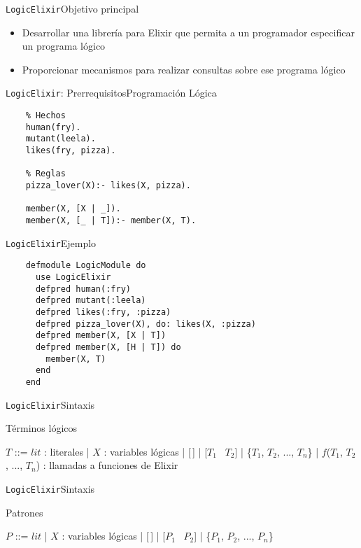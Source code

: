\documentclass[14pt,aspectratio=169]{beamer}
\begin{document}
\begin{frame}{\texttt{LogicElixir}}{Objetivo principal}
  \begin{itemize}
    \item Desarrollar una librería para Elixir que permita
    a un programador especificar un programa lógico
    \item Proporcionar mecanismos para realizar consultas sobre
    ese programa lógico
  \end{itemize}
\end{frame}

\begin{frame}[fragile]{\texttt{LogicElixir}: Prerrequisitos}{Programación Lógica}
  \begin{verbatim}
    % Hechos
    human(fry).
    mutant(leela).
    likes(fry, pizza).

    % Reglas
    pizza_lover(X):- likes(X, pizza).

    member(X, [X | _]).
    member(X, [_ | T]):- member(X, T).

  \end{verbatim}
\end{frame}

\begin{frame}[fragile]{\texttt{LogicElixir}}{Ejemplo}
  \small \begin{verbatim}
    defmodule LogicModule do
      use LogicElixir
      defpred human(:fry)
      defpred mutant(:leela)
      defpred likes(:fry, :pizza)
      defpred pizza_lover(X), do: likes(X, :pizza)
      defpred member(X, [X | T])
      defpred member(X, [H | T]) do
        member(X, T)
      end
    end
  \end{verbatim}
\end{frame}

\begin{frame}{\texttt{LogicElixir}}{Sintaxis}
  \footnotesize \begin{block}{Términos lógicos}
    \begin{bnfgrammar}
      $T$ ::= $lit$ : literales
        | $X$ : variables lógicas
        | [\,]
        | [$T_1$ \textbar\ $T_2$]
        | \{$T_1$, $T_2$, ..., $T_n$\}
        | $f$($T_1$, $T_2$, ..., $T_n$) : llamadas a funciones de Elixir
    \end{bnfgrammar}
  \end{block}
\end{frame}

\begin{frame}{\texttt{LogicElixir}}{Sintaxis}
  \begin{block}{Patrones}
    \begin{bnfgrammar}
      $P$ ::= $lit$
      | $X$ : variables lógicas
      | [\,]
      | [$P_1$ \textbar\ $P_2$]
      | \{$P_1$, $P_2$, ..., $P_n$\}
    \end{bnfgrammar}
  \end{block}
\end{frame}
\end{document}
